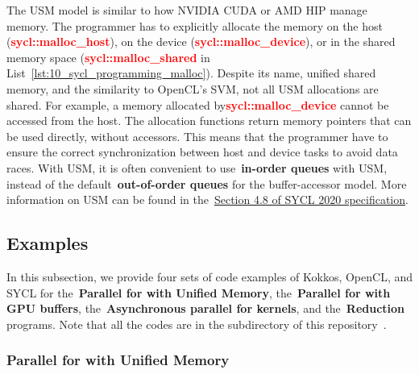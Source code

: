 \par
The USM model is similar to how NVIDIA CUDA or AMD HIP manage memory.
The programmer has to explicitly allocate the memory on the host (\textbf{\textcolor{red}{sycl::malloc\_host}}), on the device (\textbf{\textcolor{red}{sycl::malloc\_device}}), or in the shared memory space (\textbf{\textcolor{red}{sycl::malloc\_shared}} in List~\ref{lst:10_sycl_programming_malloc}).
Despite its name, unified shared memory, and the similarity to OpenCL’s SVM, not all USM allocations are shared.
For example, a memory allocated by\textbf{\textcolor{red}{sycl::malloc\_device}} cannot be accessed from the host.
The allocation functions return memory pointers that can be used directly, without accessors.
This means that the programmer have to ensure the correct synchronization between host and device tasks to avoid data races.
With USM, it is often convenient to use~\textbf{in-order queues} with USM, instead of the default~\textbf{out-of-order queues} for the buffer-accessor model.
More information on USM can be found in the~\href{https://registry.khronos.org/SYCL/specs/sycl-2020/html/sycl-2020.html#sec:usm}{Section 4.8 of SYCL 2020 specification}.







\subsection{Examples}


\par
In this subsection, we provide four sets of code examples of Kokkos, OpenCL, and SYCL for the~\textbf{Parallel for with Unified Memory}, the~\textbf{Parallel for with GPU buffers}, the~\textbf{Asynchronous parallel for kernels}, and the~\textbf{Reduction} programs. Note that all the codes are in the subdirectory of this repository~\cite{gpu-programming-examples}.


\subsubsection{Parallel for with Unified Memory}


